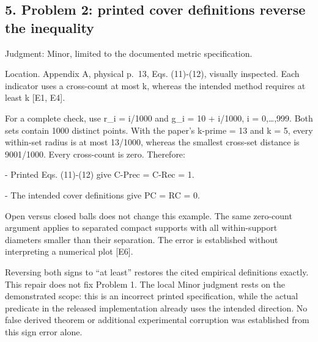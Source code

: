 \documentclass[10pt]{article}
\begin{document}
\subsection*{5. Problem 2: printed cover definitions reverse the inequality}
Judgment: Minor, limited to the documented metric specification.\par
Location. Appendix A, physical p. 13, Eqs. (11)-(12), visually inspected. Each indicator uses a cross-count at most k, whereas the intended method requires at least k [E1, E4].\par
For a complete check, use r\_i = i/1000 and g\_i = 10 + i/1000, i = 0,…,999. Both sets contain 1000 distinct points. With the paper’s k-prime = 13 and k = 5, every within-set radius is at most 13/1000, whereas the smallest cross-set distance is 9001/1000. Every cross-count is zero. Therefore:\par
- Printed Eqs. (11)-(12) give C-Prec = C-Rec = 1.\par
- The intended cover definitions give PC = RC = 0.\par
Open versus closed balls does not change this example. The same zero-count argument applies to separated compact supports with all within-support diameters smaller than their separation. The error is established without interpreting a numerical plot [E6].\par
Reversing both signs to “at least” restores the cited empirical definitions exactly. This repair does not fix Problem 1. The local Minor judgment rests on the demonstrated scope: this is an incorrect printed specification, while the actual predicate in the released implementation already uses the intended direction. No false derived theorem or additional experimental corruption was established from this sign error alone.\par
\end{document}
